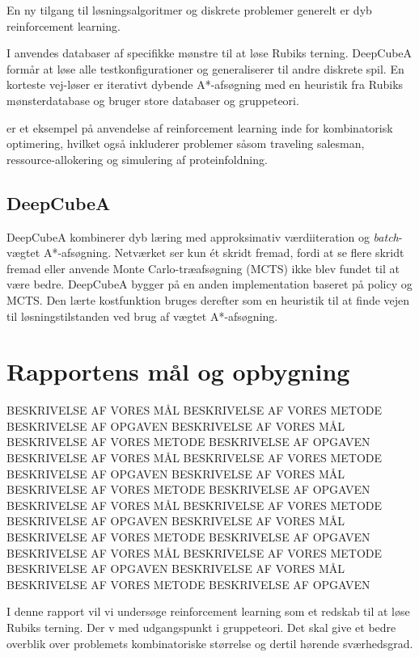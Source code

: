 \documentclass[../main.tex]{subfiles}
\begin{document}
En ny tilgang til løsningsalgoritmer og diskrete problemer generelt er dyb reinforcement learning. 


I \cite{SolvingNature} anvendes databaser af specifikke mønstre til at løse Rubiks terning. DeepCubeA formår at løse alle testkonfigurationer og generaliserer til andre diskrete spil. En korteste vej-løser er iterativt dybende A*-afsøgning med en heuristik fra Rubiks mønsterdatabase og bruger store databaser og gruppeteori. 
 
\cite{RubiksMedium} er et eksempel på anvendelse af reinforcement learning inde for kombinatorisk optimering, hvilket også inkluderer problemer såsom traveling salesman, ressource-allokering og simulering af proteinfoldning. 

\subsection{DeepCubeA}
DeepCubeA \cite{SolvingNature} kombinerer dyb læring med approksimativ værdiiteration og \emph{batch}-vægtet A*-afsøgning.
Netværket ser kun ét skridt fremad, fordi at se flere skridt fremad eller anvende Monte Carlo-træafsøgning (MCTS) ikke blev fundet til at være bedre.
DeepCubeA bygger på en anden implementation baseret på policy og MCTS.
Den lærte kostfunktion bruges derefter som en heuristik til at finde vejen til løsningstilstanden ved brug af vægtet A*-afsøgning.


\section{Rapportens mål og opbygning}BESKRIVELSE AF VORES MÅL BESKRIVELSE AF VORES METODE BESKRIVELSE AF OPGAVEN BESKRIVELSE AF VORES MÅL BESKRIVELSE AF VORES METODE BESKRIVELSE AF OPGAVEN BESKRIVELSE AF VORES MÅL BESKRIVELSE AF VORES METODE BESKRIVELSE AF OPGAVEN BESKRIVELSE AF VORES MÅL BESKRIVELSE AF VORES METODE BESKRIVELSE AF OPGAVEN 
BESKRIVELSE AF VORES MÅL BESKRIVELSE AF VORES METODE BESKRIVELSE AF OPGAVEN BESKRIVELSE AF VORES MÅL BESKRIVELSE AF VORES METODE BESKRIVELSE AF OPGAVEN BESKRIVELSE AF VORES MÅL BESKRIVELSE AF VORES METODE BESKRIVELSE AF OPGAVEN BESKRIVELSE AF VORES MÅL BESKRIVELSE AF VORES METODE BESKRIVELSE AF OPGAVEN 

I denne rapport vil vi undersøge reinforcement learning som et redskab til at løse Rubiks terning.
Der v med udgangspunkt i gruppeteori.
Det skal give et bedre overblik over problemets kombinatoriske størrelse og dertil hørende sværhedsgrad.
\end{document}
